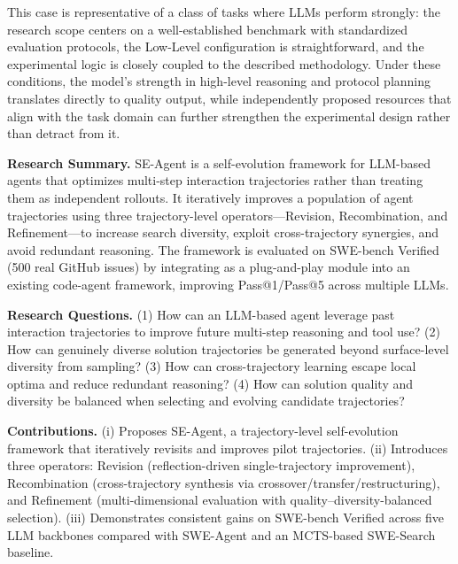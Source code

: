  This case is representative of a class of tasks where LLMs perform strongly: the research scope centers on a well-established benchmark with standardized evaluation protocols, the Low-Level configuration is straightforward, and the experimental logic is closely coupled to the described methodology. Under these conditions, the model's strength in high-level reasoning and protocol planning translates directly to quality output, while independently proposed resources that align with the task domain can further strengthen the experimental design rather than detract from it.

\begin{tcolorbox}[
	title={Box 10: Case 1 --- Research Task Overview(Input)},
	colback=blue!3!white,
	colframe=blue!30!black,
	colbacktitle=blue!15!white,
	coltitle=black,
	fonttitle=\bfseries,
	arc=3mm,
	boxrule=0.8pt,
	breakable
]
\small
\textbf{Research Summary.} SE-Agent is a self-evolution framework for LLM-based agents that optimizes multi-step interaction trajectories rather than treating them as independent rollouts. It iteratively improves a population of agent trajectories using three trajectory-level operators---Revision, Recombination, and Refinement---to increase search diversity, exploit cross-trajectory synergies, and avoid redundant reasoning. The framework is evaluated on SWE-bench Verified (500 real GitHub issues) by integrating as a plug-and-play module into an existing code-agent framework, improving Pass@1/Pass@5 across multiple LLMs.

\smallskip
\textbf{Research Questions.} (1) How can an LLM-based agent leverage past interaction trajectories to improve future multi-step reasoning and tool use? (2) How can genuinely diverse solution trajectories be generated beyond surface-level diversity from sampling? (3) How can cross-trajectory learning escape local optima and reduce redundant reasoning? (4) How can solution quality and diversity be balanced when selecting and evolving candidate trajectories?

\smallskip
\textbf{Contributions.} (i) Proposes SE-Agent, a trajectory-level self-evolution framework that iteratively revisits and improves pilot trajectories. (ii) Introduces three operators: Revision (reflection-driven single-trajectory improvement), Recombination (cross-trajectory synthesis via crossover/transfer/restructuring), and Refinement (multi-dimensional evaluation with quality--diversity-balanced selection). (iii) Demonstrates consistent gains on SWE-bench Verified across five LLM backbones compared with SWE-Agent and an MCTS-based SWE-Search baseline.


\end{tcolorbox}
